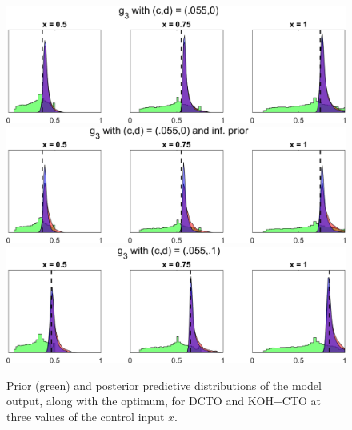 \documentclass[12pt]{article}
\begin{document}
\begin{figure}
	\centering
	\includegraphics[scale=0.85]{FIG_DCTO_KOHCTO_post_pred_dist_discrep5}\\
	\vspace{1em}
	\includegraphics[scale=0.85]{FIG_DCTO_KOHCTO_post_pred_dist_discrep5_inf}\\
	\vspace{1em}
	\includegraphics[scale=0.85]{FIG_DCTO_KOHCTO_post_pred_dist_discrep6}
	\captionsetup{width=.85\linewidth}
	\caption{Prior (green) and posterior predictive distributions of the model output, along with the optimum, for DCTO and KOH+CTO at three values of the control input $x$.}
	\label{fig:3_post_dist}
\end{figure}
%
\end{document}
